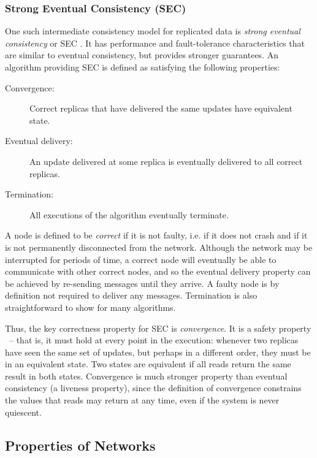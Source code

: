 \subsubsection{Strong Eventual Consistency (SEC)}

One such intermediate consistency model for replicated data is \emph{strong eventual consistency} or
SEC \cite{Shapiro:2011un}. It has performance and fault-tolerance characteristics that are similar
to eventual consistency, but provides stronger guarantees. An algorithm providing SEC is defined as
satisfying the following properties:

\begin{description}
\item[Convergence:] Correct replicas that have delivered the same updates have equivalent state.
\item[Eventual delivery:] An update delivered at some replica is eventually delivered to all correct
replicas.
\item[Termination:] All executions of the algorithm eventually terminate.
\end{description}

A node is defined to be \emph{correct} if it is not faulty, i.e. if it does not crash and if it is
not permanently disconnected from the network. Although the network may be interrupted for periods
of time, a correct node will eventually be able to communicate with other correct nodes, and so the
eventual delivery property can be achieved by re-sending messages until they arrive. A faulty node
is by definition not required to deliver any messages. Termination is also straightforward to show
for many algorithms.

Thus, the key correctness property for SEC is \emph{convergence}. It is a safety property
\cite{Alpern:1985dg}~-- that is, it must hold at every point in the execution: whenever two replicas
have seen the same set of updates, but perhaps in a different order, they must be in an equivalent
state. Two states are equivalent if all reads return the same result in both states. Convergence is
much stronger property than eventual consistency (a liveness property), since the definition of
convergence constrains the values that reads may return at any time, even if the system is never
quiescent.

\subsection{Properties of Networks}\label{sect.background.networks}

